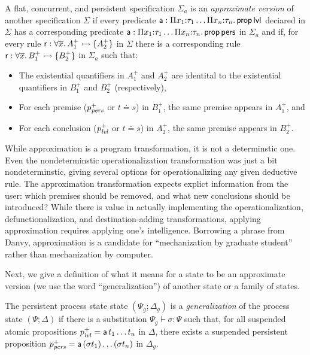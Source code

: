 \bigskip
\begin{definition}\label{def:approxversion}
  A flat, concurrent, and persistent specification $\Sigma_a$ is an
  {\em approximate version} of another specification $\Sigma$ if every
  predicate ${\sf a} : \Pi x_1{:}\tau_1 \ldots \Pi x_n{:}\tau_n.\,
  {\sf prop}\,{\sf lvl}$ deciared in $\Sigma$ has a corresponding
  predicate ${\sf a} : \Pi x_1{:}\tau_1 \ldots \Pi x_n{:}\tau_n.\,
  {\sf prop}\,{\sf pers}$ in $\Sigma_a$ and if, for every rule ${\sf
    r} : \forall \overline{x}.\,A_1^+ \rightarrowtail \{ A_2^+ \}$ in $\Sigma$ there
  is a corresponding rule ${\sf r} : \forall \overline{x}.\,B_1^+ \rightarrowtail
  \{ B_2^+ \}$ in $\Sigma_a$ such that:
  \begin{itemize}
  \item The existential quantifiers in $A_1^+$ and $A_2^+$ are
    identital to the existential quantifiers in $B_1^+$ and $B_2^+$
    (respectively),
  \item For each premise ($p^+_{\it pers}$ or $t \doteq s$) in $B^+_1$,
    the same premise appears in $A^+_1$, and 
  \item For each conclusion ($p^+_{\it lvl}$ or $t
    \doteq s$) in $A^+_2$, the same premise appears in $B^+_2$.
  \end{itemize}
\end{definition}
\bigskip

\noindent
While approximation is a program transformation, it is not a
determinstic one. Even the nondeterminstic operationalization
transformation was just a bit nondeterminstic, giving several options
for operationalizing any given deductive rule. The approximation
transformation expects explict information from the user: which
premises should be removed, and what new conclusions should be
introduced? While there is value in actually implementing the
operationalization, defunctionalization, and destination-adding
transformations, applying approximation requires applying one's
intelligence. Borrowing a phrase from Danvy, approximation is a
candidate for ``mechanization by graduate student'' rather than
mechanization by computer.

Next, we give a definition of what it means for a state to be an 
approximate version (we use the word ``generalization'') of another state
or a family of states. 

\bigskip
\begin{definition}
  The persistent process state state $(\Psi_g; \Delta_g)$ is a {\em
    generalization} of the process state $(\Psi; \Delta)$ if there is
  a substitution $\Psi_g \vdash \sigma : \Psi$ such that, for all
  suspended atomic propositions $p^+_{\it lvl} = {\sf a}\,t_1\ldots t_n$
  in $\Delta$, there exists a suspended persistent proposition
  $p^+_{\it pers} = {\sf a}\,(\sigma t_1)\ldots(\sigma t_n)$ in
  $\Delta_g$.
\end{definition}
\bigskip

